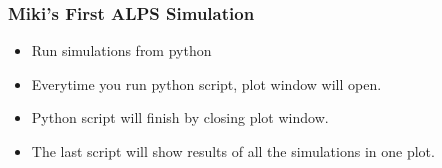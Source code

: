 \begin{frame}[fragile]
  \frametitle{Miki's First ALPS Simulation}
  \begin{itemize}
    \item Run simulations from python
    \item Everytime you run python script, plot window will open.
    \item Python script will finish by closing plot window.
    \item The last script will show results of all the simulations in one plot.
  \end{itemize}
\end{frame}



